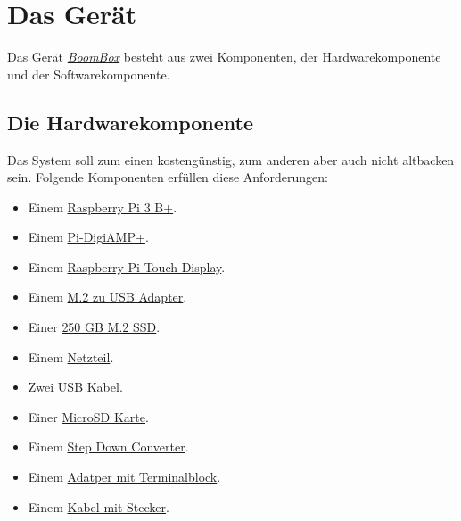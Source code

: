 \documentclass[12pt,a4paper]{article}
\newcommand{\bb}{\textit{\href{https://github.com/ThirtySomething/BoomBox}{BoomBox}}}
\newcommand{\rpi}{\href{https://www.raspberrypi.org/}{Raspberry Pi}\index{Raspberry Pi}}
\begin{document}
\section{Das Gerät}
Das Gerät \bb{} besteht aus zwei Komponenten, der Hardwarekomponente und der Softwarekomponente.

\subsection{Die Hardwarekomponente}
Das System soll zum einen kostengünstig, zum anderen aber auch nicht altbacken sein. Folgende Komponenten erfüllen diese Anforderungen:

\begin{itemize}
    \item Einem \href{https://www.raspberrypi.org/products/raspberry-pi-3-model-b-plus/}{\rpi{} 3 B+}.
    \item Einem \href{http://iqaudio.co.uk/hats/9-pi-digiamp.html}{Pi-DigiAMP+}.
    \item Einem \href{https://www.raspberrypi.org/products/raspberry-pi-touch-display/}{\rpi{} Touch Display}.
    \item Einem \href{https://www.conrad.de/de/m2-sata-ssd-erweiterungs-platine-fuer-den-raspberry-pi-1487097.html}{M.2 zu USB Adapter}.
    \item Einer \href{https://www.wd.com/de-de/products/internal-ssd/wd-blue-3d-nand-sata-ssd.html}{250 GB M.2 SSD}.
    \item Einem \href{https://www.amazon.de/gp/product/B002JIGJ4M/ref=ppx_yo_dt_b_asin_title_o04_s00?ie=UTF8&psc=1}{Netzteil}.
    \item Zwei \href{https://www.amazon.de/gp/product/B01GJC4WRO/ref=ppx_yo_dt_b_asin_title_o07_s00?ie=UTF8&psc=1}{USB Kabel}.
    \item Einer \href{https://www.amazon.de/gp/product/B073S9SFK2/ref=ppx_yo_dt_b_asin_title_o07_s00?ie=UTF8&psc=1}{MicroSD Karte}.
    \item Einem \href{https://www.amazon.de/gp/product/B07KFFNBLJ/ref=ppx_yo_dt_b_asin_title_o03_s00?ie=UTF8&psc=1}{Step Down Converter}.
    \item Einem \href{https://www.amazon.de/gp/product/B071KVWQKY/ref=ppx_yo_dt_b_asin_title_o05_s00?ie=UTF8&psc=1}{Adatper mit Terminalblock}.
    \item Einem \href{https://www.amazon.de/gp/product/B00A6QKIEQ/ref=ppx_yo_dt_b_asin_title_o06_s00?ie=UTF8&psc=1}{Kabel mit Stecker}.
\end{itemize}
\end{document}
